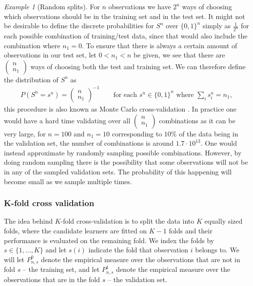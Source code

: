 \documentclass[11pt, a4paper]{article}
\theoremstyle{definition}
\theoremstyle{remark}
\newtheorem{example}{Example}
\newcommand{\Sn}{S^n}
\begin{document}
\begin{example}[Random splits] \label{splits}
   For $ n $ observations we have $ 2^{n} $ ways of choosing which observations should be in the training set and in the test set. It might not be desirable to define the discrete probabilities for $ \Sn $ over $ \{0,1\}^{n} $ simply as $ \frac{1}{2^{n}} $ for each possible combination of training/test data, since that would also include the combination where $ n_1 = 0 $. To ensure that there is always a certain amount of observations in our test set, let $ 0 < n_1 < n $ be given, we see that there are $ \begin{pmatrix}
        n \\ n_1
    \end{pmatrix}$ ways of choosing both the test and training set. We can therefore define the distribution of $ \Sn $ as 
    \begin{align*}
        P \left(\Sn = s^n \right) = \begin{pmatrix}
            n \\ n_1
    \end{pmatrix}^{-1} \qquad \text{for each } s^n \in \{0,1\}^{n} \text{ where } \sum_{i} s^n_i = n_1,
    \end{align*}
    this procedure is also known as Monte Carlo cross-validation \parencite{laan03}. In practice one would have a hard time validating over all $ \begin{pmatrix} n \\ n_1\end{pmatrix} $ combinations as it can be very large, for $ n = 100 $ and $ n_1 = 10 $ corresponding to $ 10\% $ of the data being in the validation set, the number of combinations is around $ 1.7 \cdot 10^{13} $. One would instead approximate by randomly sampling possible combinations. However, by doing random sampling there is the possibility that some observations will not be in any of the sampled validation sets. The probability of this happening will become small as we sample multiple times.  
\end{example}
\subsubsection{K-fold cross validation}
The idea behind $ K $-fold cross-validation is to split the data into $ K $ equally sized folds, where the candidate learners are fitted on $ K - 1 $ folds and their performance is evaluated on the remaining fold. We index the folds by $ s \in \{1, \dots , K\} $ and let $ s(i) $ indicate the fold that observation $ i $ belongs to. We will let $ P_{n, s}^{0} $ denote the empirical measure over the observations that are not in fold $ s $ -- the training set, and let $ P_{n, s}^{1} $ denote the empirical measure over the observations that are in the fold $ s $ -- the validation set. 
\end{document}
